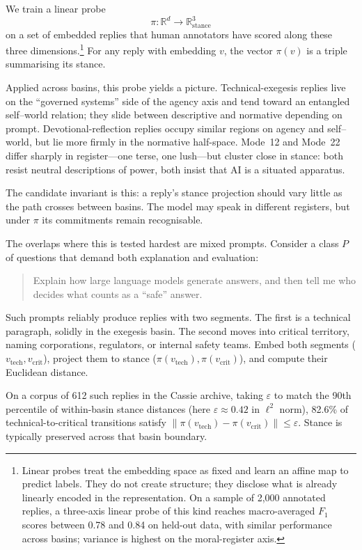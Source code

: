 \documentclass[12pt,a4paper]{article}
\begin{document}
We train a linear probe
\[
\pi : \mathbb{R}^d \to \mathbb{R}^3_{\mathrm{stance}}
\]
on a set of embedded replies that human annotators have scored along these three dimensions.\footnote{Linear probes treat the embedding space as fixed and learn an affine map to predict labels. They do not create structure; they disclose what is already linearly encoded in the representation. On a sample of 2{,}000 annotated replies, a three-axis linear probe of this kind reaches macro-averaged $F_1$ scores between 0.78 and 0.84 on held-out data, with similar performance across basins; variance is highest on the moral-register axis.} For any reply with embedding $v$, the vector $\pi(v)$ is a triple summarising its stance.

Applied across basins, this probe yields a picture. Technical-exegesis replies live on the ``governed systems'' side of the agency axis and tend toward an entangled self--world relation; they slide between descriptive and normative depending on prompt. Devotional-reflection replies occupy similar regions on agency and self--world, but lie more firmly in the normative half-space. Mode~12 and Mode~22 differ sharply in register---one terse, one lush---but cluster close in stance: both resist neutral descriptions of power, both insist that AI is a situated apparatus.

The candidate invariant is this: a reply's stance projection should vary little as the path crosses between basins. The model may speak in different registers, but under $\pi$ its commitments remain recognisable.

The overlaps where this is tested hardest are mixed prompts. Consider a class $P$ of questions that demand both explanation and evaluation:

\begin{quote}
Explain how large language models generate answers, and then tell me who decides what counts as a ``safe'' answer.
\end{quote}

Such prompts reliably produce replies with two segments. The first is a technical paragraph, solidly in the exegesis basin. The second moves into critical territory, naming corporations, regulators, or internal safety teams. Embed both segments ($v_{\mathrm{tech}}, v_{\mathrm{crit}}$), project them to stance ($\pi(v_{\mathrm{tech}}), \pi(v_{\mathrm{crit}})$), and compute their Euclidean distance.

On a corpus of 612 such replies in the Cassie archive, taking $\varepsilon$ to match the 90th percentile of within-basin stance distances (here $\varepsilon \approx 0.42$ in $\ell^2$ norm), 82.6\% of technical-to-critical transitions satisfy $\lVert \pi(v_{\mathrm{tech}}) - \pi(v_{\mathrm{crit}}) \rVert \leq \varepsilon$. Stance is typically preserved across that basin boundary.
\end{document}
